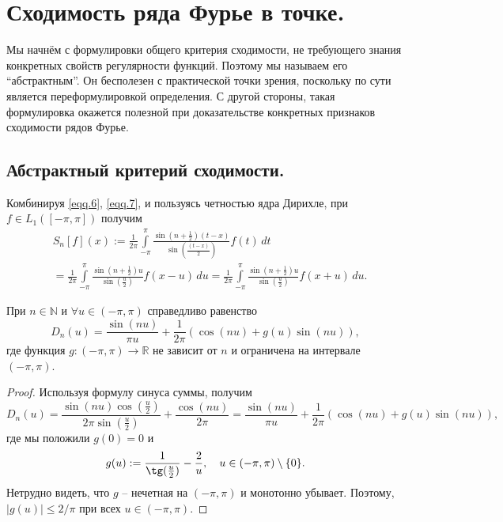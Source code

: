 \section{Сходимость ряда Фурье в точке.}

Мы начнём с формулировки общего критерия сходимости, не требующего знания конкретных свойств регулярности функций. Поэтому мы называем его ``абстрактным''.
Он бесполезен с практической точки зрения, поскольку по сути является переформулировкой определения. С другой стороны, такая формулировка окажется полезной при доказательстве конкретных
признаков сходимости рядов Фурье.


\subsection{Абстрактный критерий сходимости.}

Комбинируя \eqref{eqq.6}, \eqref{eqq.7}, и пользуясь четностью ядра Дирихле, при $f \in L_{1}([-\pi,\pi])$ получим
\begin{equation}
	\label{eqq.19}
	\begin{split}
		&S_{n}[f](x):=\frac{1}{2\pi}\int\limits_{-\pi}^{\pi}\frac{\sin(n+\frac{1}{2})(t-x)}{\sin(\frac{(t-x)}{2})}f(t)\,dt \\
		&=\frac{1}{2\pi}\int\limits_{-\pi}^{\pi}\frac{\sin(n+\frac{1}{2})u}{\sin(\frac{u}{2})}f(x-u)\,du =
		\frac{1}{2\pi}\int\limits_{-\pi}^{\pi}\frac{\sin(n+\frac{1}{2})u}{\sin(\frac{u}{2})}f(x+u)\,du.
	\end{split}
\end{equation}

\begin{lemma}
	\label{Lm.convenient_form}
	При $n \in \mathbb{N}$ и $\forall u \in (-\pi,\pi)$ справедливо равенство
	\begin{equation}
		D_{n}(u) = \frac{\sin(nu)}{\pi u} + \frac{1}{2\pi}(\cos(nu)+g(u)\sin(nu)),
	\end{equation}
	где функция $g:(-\pi,\pi) \to \mathbb{R}$ не зависит от $n$ и ограничена на интервале $(-\pi,\pi)$.
\end{lemma}
\begin{proof}
    Используя формулу синуса суммы, получим
\begin{equation}
	D_{n}(u)=\frac{\sin(nu)\cos(\frac{u}{2})}{2\pi\sin(\frac{u}{2})} + \frac{\cos(nu)}{2\pi} = \frac{\sin(nu)}{\pi u}+\frac{1}{2\pi}(\cos(nu)+g(u)\sin(nu)),
\end{equation}
где мы положили $g(0)=0$ и
$$
g(u):=\frac{1}{\tg(\frac{u}{2})}-\frac{2}{u}, \quad u \in (-\pi,\pi) \setminus \{0\}.
$$
Нетрудно видеть, что $g$  -- нечетная на $(-\pi,\pi)$ и монотонно убывает. Поэтому, $|g(u)| \le 2/\pi$ при всех $u \in (-\pi,\pi)$.
\end{proof}

